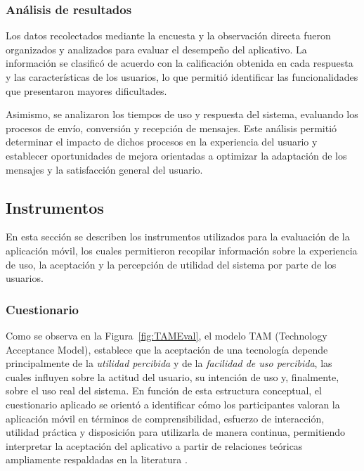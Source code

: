 \documentclass[lettersize,journal]{IEEEtran}
\begin{document}
        \subsubsection{Análisis de resultados}
        
        Los datos recolectados mediante la encuesta y la observación directa fueron organizados y analizados para evaluar el desempeño del aplicativo. La información se clasificó de acuerdo con la calificación obtenida en cada respuesta y las características de los usuarios, lo que permitió identificar las funcionalidades que presentaron mayores dificultades.
        
        Asimismo, se analizaron los tiempos de uso y respuesta del sistema, evaluando los procesos de envío, conversión y recepción de mensajes. Este análisis permitió determinar el impacto de dichos procesos en la experiencia del usuario y establecer oportunidades de mejora orientadas a optimizar la adaptación de los mensajes y la satisfacción general del usuario.

        \subsection{Instrumentos}
        
        En esta sección se describen los instrumentos utilizados para la evaluación de la aplicación móvil, los cuales permitieron recopilar información sobre la experiencia de uso, la aceptación y la percepción de utilidad del sistema por parte de los usuarios.
        
        \subsubsection{Cuestionario}
        
        Como se observa en la Figura~\ref{fig:TAMEval}, el modelo TAM (Technology Acceptance Model), establece que la aceptaci{\'o}n de una tecnolog{\'i}a depende principalmente de la \textit{utilidad percibida} y de la \textit{facilidad de uso percibida}, las cuales influyen sobre la actitud del usuario, su intenci{\'o}n de uso y, finalmente, sobre el uso real del sistema. En funci{\'o}n de esta estructura conceptual, el cuestionario aplicado se orient{\'o} a identificar c{\'o}mo los participantes valoran la aplicaci{\'o}n m{\'o}vil en t{\'e}rminos de comprensibilidad, esfuerzo de interacci{\'o}n, utilidad pr{\'a}ctica y disposici{\'o}n para utilizarla de manera continua, permitiendo interpretar la aceptaci{\'o}n del aplicativo a partir de relaciones te{\'o}ricas ampliamente respaldadas en la literatura \cite{Davis1987TAM,DeleAjayi2019TAMGames}.
        
\end{document}

